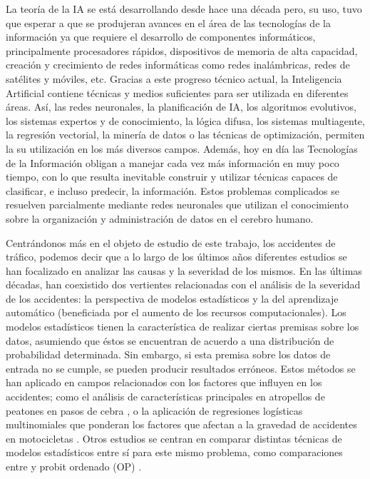 La teoría de la IA se está desarrollando desde hace una década pero, su uso, tuvo que esperar a que se produjeran avances en el área de las tecnologías de la información ya
que requiere el desarrollo de componentes informáticos, principalmente procesadores rápidos, dispositivos de memoria de alta capacidad, creación y crecimiento de redes
informáticas como redes inalámbricas, redes de satélites y móviles, etc. Gracias a este progreso técnico actual, la Inteligencia Artificial contiene técnicas y medios suficientes para ser utilizada en diferentes áreas. Así, las redes neuronales, la planificación de IA, los algoritmos evolutivos, los sistemas expertos y de conocimiento, la lógica difusa, los sistemas multiagente, la regresión vectorial, la minería de datos o las técnicas de optimización, permiten la su utilización en los más diversos campos. Además, hoy en día las Tecnologías de la Información obligan a manejar cada vez más información en muy poco tiempo, con lo que resulta inevitable construir y utilizar técnicas capaces de clasificar, e incluso predecir, la información. Estos problemas complicados se resuelven parcialmente mediante redes neuronales que utilizan el conocimiento sobre la
organización y administración de datos en el cerebro humano.


Centrándonos más en el objeto de estudio de este trabajo, los accidentes de tráfico, podemos decir que a lo largo de los últimos años diferentes estudios se han focalizado en
analizar las causas y la severidad de los mismos. En las últimas décadas, han coexistido dos vertientes relacionadas con el análisis de la severidad de los accidentes: la
perspectiva de modelos estadísticos y la del aprendizaje automático (beneficiada por el aumento de los recursos computacionales). Los modelos estadísticos tienen la
característica de realizar ciertas premisas sobre los datos, asumiendo que éstos se encuentran de acuerdo a una distribución de probabilidad determinada. Sin embargo, si
esta premisa sobre los datos de entrada no se cumple, se pueden producir resultados erróneos. Estos métodos se han aplicado en campos relacionados con los factores que
influyen en los accidentes; como el análisis de características principales en atropellos de peatones en pasos de cebra \cite{FactoresQueInfluyen2003}, o la aplicación de regresiones logísticas multinomiales que ponderan los factores que afectan a la gravedad de accidentes en motocicletas \cite{MotorcycleCrashesMultinominalStatistic}. Otros estudios se centran en comparar distintas técnicas de modelos estadísticos entre sí para este mismo problema, como comparaciones entre  y probit ordenado (OP) \cite{MetodosEstadisticosComparacionSVMOP}.


